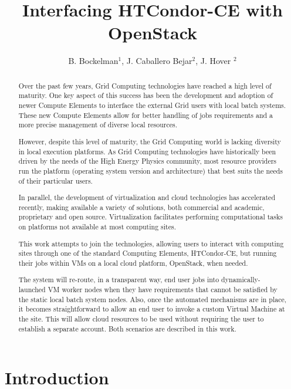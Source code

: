 \documentclass[a4paper]{jpconf}
\begin{document}
\title{Interfacing HTCondor-CE with OpenStack}

\author{B. Bockelman$^1$, J. Caballero Bejar$^2$, J. Hover $^2$}

\address{$^1$ University of Nebraska-Lincoln, Lincoln, NE 68588, USA}
\address{$^2$ Brookhaven National Laboratory, PO BOX 5000 Upton, NY 11973, USA}


\begin{abstract}
Over the past few years, Grid Computing technologies have reached a high level of maturity. 
One key aspect of this success has been the development and adoption of newer Compute Elements to interface the external Grid users with local batch systems. 
These new Compute Elements allow for better handling of jobs requirements and a more precise management of diverse local resources.

However, despite this level of maturity, the Grid Computing world is lacking diversity in local execution platforms. 
As Grid Computing technologies have historically been driven by the needs of the High Energy Physics community, 
most resource providers run the platform (operating system version and architecture) that best suits the needs of their particular users.

In parallel, the development of virtualization and cloud technologies has accelerated recently, 
making available a variety of solutions, both commercial and academic, proprietary and open source. 
Virtualization facilitates performing computational tasks on platforms not available at most computing sites.

This work attempts to join the technologies, allowing users to interact with computing sites through one of the standard Computing Elements, HTCondor-CE,
but running their jobs within VMs on a local cloud platform, OpenStack, when needed.

The system will re-route, in a transparent way, 
end user jobs into dynamically-launched VM worker nodes when they have requirements that cannot be satisfied by the static local batch system nodes. 
Also, once the automated mechanisms are in place, it becomes straightforward to allow an end user to invoke a custom Virtual Machine at the site. 
This will allow cloud resources to be used without requiring the user to establish a separate account. Both scenarios are described in this work.
\end{abstract}

\section{Introduction}
\end{document}
